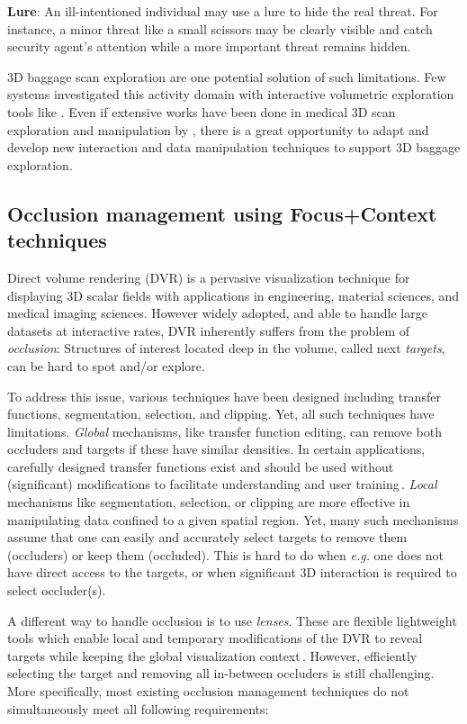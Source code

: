 \textbf{Lure}: An ill-intentioned individual may use a lure to hide the real threat. For instance, a minor threat like a small scissors may be clearly visible and catch security agent's attention while a more important threat remains hidden.


3D baggage scan exploration are one potential solution of such limitations. Few systems investigated this activity domain with interactive volumetric exploration tools like \cite{Li:2012:LVV:2425296.2425325}. Even if extensive works have been done in medical 3D scan exploration and manipulation by \cite{preim2013visual}, there is a great opportunity to adapt and develop new interaction and data manipulation techniques to support 3D baggage exploration.
 
 
 \subsection{Occlusion management using Focus+Context techniques}
 
 Direct volume rendering (DVR) is a pervasive visualization technique for displaying 3D scalar fields with applications in engineering, material sciences, and medical imaging sciences. However widely adopted, and able to handle large datasets at interactive rates, DVR inherently suffers from the problem of \emph{occlusion}: Structures of interest located deep in the volume, called next \emph{targets}, can be hard to spot and/or explore.


To address this issue, various techniques have been designed including transfer functions, segmentation, selection, and clipping. Yet, all such techniques have limitations.  \emph{Global} mechanisms, like transfer function editing, can remove both occluders and targets if these have similar densities. In certain applications, carefully designed transfer functions exist and should be used without (significant) modifications to facilitate understanding and user training\,\cite{4276082}. \emph{Local} mechanisms like segmentation, selection, or clipping are more effective in manipulating data confined to a given spatial region. Yet, many such mechanisms assume that one can easily and accurately select targets to remove them (occluders) or keep them (occluded). This is hard to do when \emph{e.g.} one does not have direct access to the targets, or when significant 3D interaction is required to select occluder(s).


A different way to handle occlusion is to use \emph{lenses}. These are flexible lightweight tools which enable local and temporary modifications of the DVR to reveal targets while keeping the global visualization context\,\cite{595268,CGF:CGF12871,6327262}. However, efficiently selecting the target and  removing all in-between occluders is still challenging. More specifically, most existing occlusion management techniques do not simultaneously meet all following requirements: 

